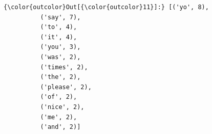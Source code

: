 \documentclass{tufte-handout}
\begin{document}
\begin{shaded}
            \begin{Verbatim}[fontsize=\footnotesize,commandchars=\\\{\}]
{\color{outcolor}Out[{\color{outcolor}11}]:} [('yo', 8),
          ('say', 7),
          ('to', 4),
          ('it', 4),
          ('you', 3),
          ('was', 2),
          ('times', 2),
          ('the', 2),
          ('please', 2),
          ('of', 2),
          ('nice', 2),
          ('me', 2),
          ('and', 2)]
\end{Verbatim}
\end{shaded}



%
%
\end{document}
